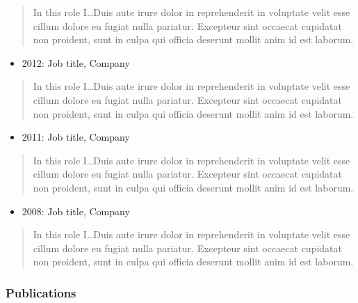 \documentclass[11pt, a4paper]{article}
\providecommand{\tightlist}{%
  \setlength{\itemsep}{0pt}\setlength{\parskip}{0pt}}
\begin{document}
\begin{raggedright}
\begin{quote}
In this role I\ldots{}Duis aute irure dolor in reprehenderit in
voluptate velit esse cillum dolore eu fugiat nulla pariatur. Excepteur
sint occaecat cupidatat non proident, sunt in culpa qui officia deserunt
mollit anim id est laborum.
\end{quote}

\begin{itemize}
\tightlist
\item
  2012: Job title, Company
\end{itemize}

\begin{quote}
In this role I\ldots{}Duis aute irure dolor in reprehenderit in
voluptate velit esse cillum dolore eu fugiat nulla pariatur. Excepteur
sint occaecat cupidatat non proident, sunt in culpa qui officia deserunt
mollit anim id est laborum.
\end{quote}

\begin{itemize}
\tightlist
\item
  2011: Job title, Company
\end{itemize}

\begin{quote}
In this role I\ldots{}Duis aute irure dolor in reprehenderit in
voluptate velit esse cillum dolore eu fugiat nulla pariatur. Excepteur
sint occaecat cupidatat non proident, sunt in culpa qui officia deserunt
mollit anim id est laborum.
\end{quote}

\begin{itemize}
\tightlist
\item
  2008: Job title, Company
\end{itemize}

\begin{quote}
In this role I\ldots{}Duis aute irure dolor in reprehenderit in
voluptate velit esse cillum dolore eu fugiat nulla pariatur. Excepteur
sint occaecat cupidatat non proident, sunt in culpa qui officia deserunt
mollit anim id est laborum.
\end{quote}

\newpage

\subsubsection{Publications}


\end{raggedright}
\end{document}
